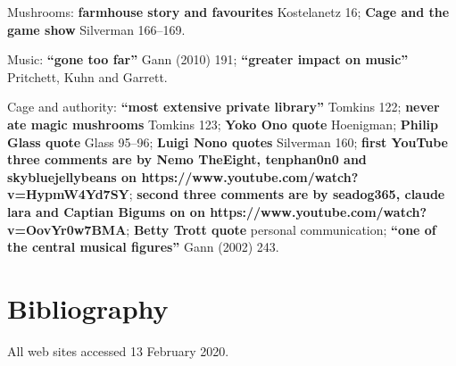 Mushrooms:
\textbf{farmhouse story and favourites} Kostelanetz 16;
\textbf{Cage and the game show} Silverman 166--169.


Music:
\textbf{``gone too far''} Gann (2010) 191;
\textbf{``greater impact on music''} Pritchett, Kuhn and Garrett.

Cage and authority:
\textbf{``most extensive private library''} Tomkins 122;
\textbf{never ate magic mushrooms} Tomkins 123;
\textbf{Yoko Ono quote} Hoenigman;
\textbf{Philip Glass quote} Glass 95--96;
\textbf{Luigi Nono quotes} Silverman 160;
\textbf{first YouTube three comments are by Nemo TheEight, tenphan0n0 and skybluejellybeans on https://www.youtube.com/watch?v=HypmW4Yd7SY};
\textbf{second three comments are by seadog365, claude lara and Captian Bigums on on https://www.youtube.com/watch?v=OovYr0w7BMA};
\textbf{Betty Trott quote} personal communication;
\textbf{``one of the central musical figures''} Gann (2002) 243.

\newpage

\section{Bibliography}

All web sites accessed 13 February 2020.

